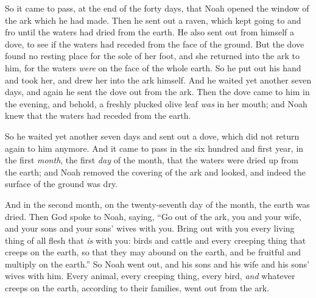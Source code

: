 \bverse So it came to pass, at the end of the forty days, that Noah opened the window of the ark which he had made.
\bverse Then he sent out a raven, which kept going to and fro until the waters had dried from the earth.
\bverse He also sent out from himself a dove, to see if the waters had receded from the face of the ground.
\bverse But the dove found no resting place for the sole of her foot, and she returned into the ark to him, for the waters \textit{were} on the face of the whole earth. So he put out his hand and took her, and drew her into the ark himself.
\bverse And he waited yet another seven days, and again he sent the dove out from the ark.
\bverse Then the dove came to him in the evening, and behold, a freshly plucked olive leaf \textit{was} in her mouth; and Noah knew that the waters had receded from the earth.

\bverse So he waited yet another seven days and sent out a dove, which did not return again to him anymore. 
\bverse And it came to pass in the six hundred and first year, in the first \textit{month}, the first \textit{day} of the month, that the waters were dried up from the earth; and Noah removed the covering of the ark and looked, and indeed the surface of the ground was dry.
	
\bverse And in the second month, on the twenty-seventh day of the month, the earth was dried.
\bverse Then God spoke to Noah, saying,
\bverse ``Go out of the ark, you and your wife, and your sons and your sons' wives with you.
\bverse Bring out with you every living thing of all flesh that \textit{is} with you: birds and cattle and every creeping thing that creeps on the earth, so that they may abound on the earth, and be fruitful and multiply on the earth.''
\bverse So Noah went out, and his sons and his wife and his sons' wives with him.
\bverse Every animal, every creeping thing, every bird, \textit{and} whatever creeps on the earth, according to their families, went out from the ark.

